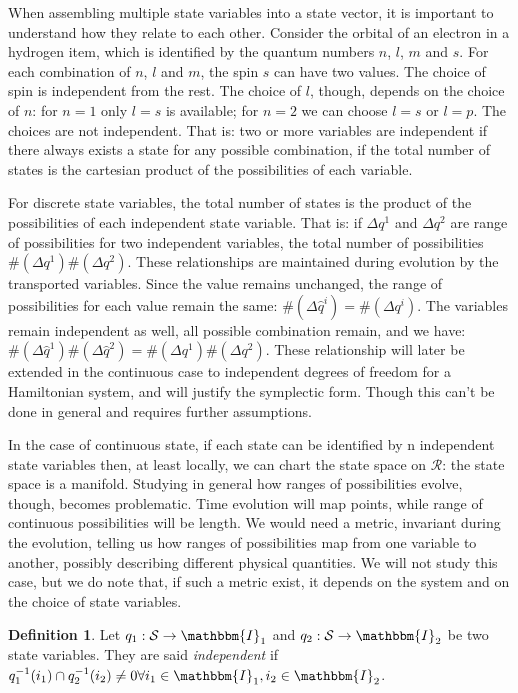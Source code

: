 \documentclass[aps,pra,10pt,twocolumn,floatfix,nofootinbib]{revtex4-1}
\theoremstyle{definition}
\newtheorem{defn}[prop]{Definition}
\begin{document}
When assembling multiple state variables into a state vector, it is important to understand how they relate to each other. Consider the orbital of an electron in a hydrogen item, which is identified by the quantum numbers $n$, $l$, $m$ and $s$. For each combination of $n$, $l$ and $m$, the spin $s$ can have two values. The choice of spin is independent from the rest. The choice of $l$, though, depends on the choice of $n$: for $n=1$ only $l=s$ is available; for $n=2$ we can choose $l=s$ or $l=p$. The choices are not independent. That is: two or more variables are independent if there always exists a state for any possible combination, if the total number of states is the cartesian product of the possibilities of each variable.

For discrete state variables, the total number of states is the product of the possibilities of each independent state variable. That is: if $\Delta q^1$ and $\Delta q^2$ are range of possibilities for two independent variables, the total number of possibilities $\#(\Delta q^1) \#(\Delta q^2)$. These relationships are maintained during evolution by the transported variables. Since the value remains unchanged, the range of possibilities for each value remain the same: $\#(\Delta \hat{q}^i) = \#(\Delta q^i)$. The variables remain independent as well, all possible combination remain, and we have: $\#(\Delta \hat{q}^1) \#(\Delta \hat{q}^2) = \#(\Delta q^1) \#(\Delta q^2)$. These relationship will later be extended in the continuous case to independent degrees of freedom for a Hamiltonian system, and will justify the symplectic form. Though this can't be done in general and requires further assumptions.

In the case of continuous state, if each state can be identified by n independent state variables then, at least locally, we can chart the state space on $\mathcal{R}$: the state space is a manifold. Studying in general how ranges of possibilities evolve, though, becomes problematic. Time evolution will map points, while range of continuous possibilities will be length. We would need a metric, invariant during the evolution, telling us how ranges of possibilities map from one variable to another, possibly describing different physical quantities. We will not study this case, but we do note that, if such a metric exist, it depends on the system and on the choice of state variables.

\begin{defn}\label{independent_state_variables}
Let $q_1 : \mathcal{S} \rightarrow \mathbbm{I}_1$ and $q_2 : \mathcal{S} \rightarrow \mathbbm{I}_2$ be two state variables. They are said \emph{independent} if $q_1^{-1}(i_1)\cap q_2^{-1}(i_2) \neq 0 \forall i_1 \in \mathbbm{I}_1, i_2 \in \mathbbm{I}_2$.
\end{defn}
\end{document}
